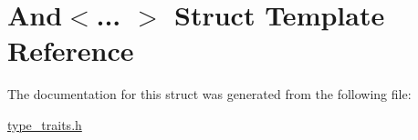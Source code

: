 \hypertarget{struct_and}{}\section{And$<$... $>$ Struct Template Reference}
\label{struct_and}


The documentation for this struct was generated from the following file\+:\begin{DoxyCompactItemize}
\item 
\hyperlink{type__traits_8h}{type\+\_\+traits.\+h}\end{DoxyCompactItemize}

